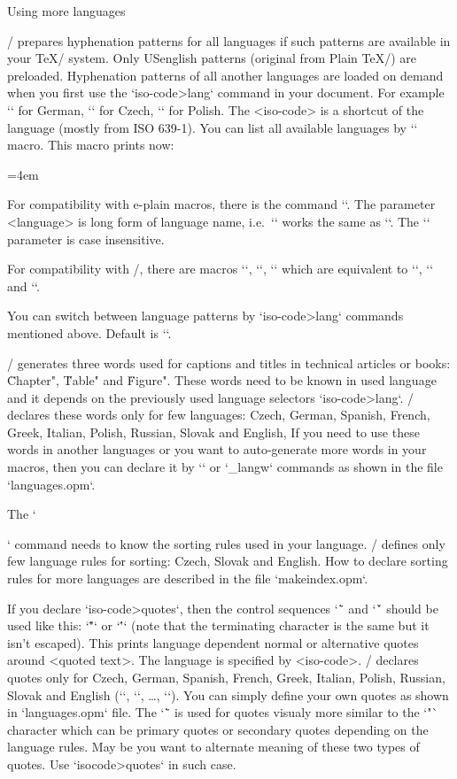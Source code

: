 {\secc[lang] Using more languages

\OpTeX/ prepares hyphenation patterns for all languages if such patterns are
available in your \TeX/ system. 
\new
Only USenglish patterns (original from Plain \TeX/) are preloaded.
Hyphenation patterns of all another languages are loaded on demand when you first use
the `\<iso-code>lang` command in your document. 
For example `\delang` for German, `\cslang` for
Czech, `\pllang` for Polish. The <iso-code> is a shortcut 
of the language (mostly from ISO 639-1). 
You can list all available languages by `\langlist` 
macro. This macro prints now:

\medskip
{\typosize[9/11.5]\emergencystretch=4em 
\noindent \langlist
\par}
\medskip

\new
For compatibility with e-plain macros, there is the command
``. The parameter <language> is long form of
language name, i.e.\ `` works the same as `\cslang`.
The `\uselanguage` parameter is case insensitive.

For compatibility with \csplain/, there are macros `\ehyph`, `\chyph`,
`\shyph` which are equivalent to `\enlang`, `\cslang` and `\sklang`.

You can switch between language patterns by `\<iso-code>lang` commands mentioned
above. Default is `\enlang`.

\OpTeX/ generates three words used for captions and titles in technical
articles or books: \"Chapter", \"Table" and \"Figure". These words need to be known
in used language and it depends on the previously used language selectors
`\<iso-code>lang`. \OpTeX/ declares these words only for few languages:
\new
Czech, German, Spanish, French, Greek, Italian, Polish, Russian, Slovak and 
English, If you need to use these words in another languages or you want to
auto-generate more words in your macros, then you can declare it by 
`\sdef` or `\_langw` commands as shown in the file `languages.opm`.

The `\makeindex` command needs to know the sorting rules used in your language.
\OpTeX/ defines only few language rules for sorting: Czech,
Slovak and English. How to declare sorting rules for more languages are
described in the file `makeindex.opm`.

If you declare `\<iso-code>quotes`, then the control sequences `\"` and `\'`
should be used like this: `\"<quoted text>"` or `\'<quoted text>'` 
(note that the terminating character is the same but it isn't escaped).
This prints language dependent normal or alternative quotes around 
<quoted text>. The language is specified by <iso-code>. \OpTeX/ declares
quotes only for Czech, German, Spanish, French, Greek, Italian, Polish, 
Russian, Slovak and English (`\csquotes`, `\dequotes`, \dots, `\enquotes`). 
You can simply define your own quotes as shown in `languages.opm` file.
The `\"` is used for quotes visualy more similar to the `"` character which
can be primary quotes or secondary quotes depending on the language rules.
May be you want to alternate meaning of these two types of quotes. Use
`\<isocode>quotes\altquotes` in such case.

}

